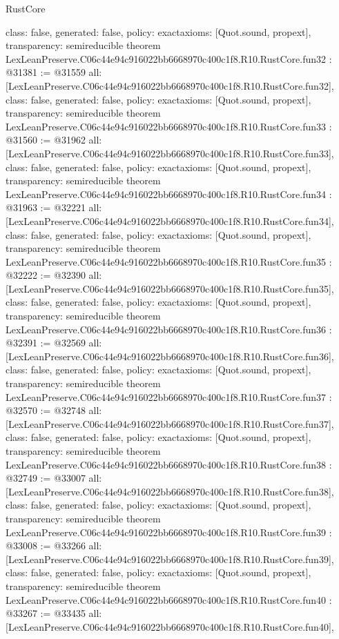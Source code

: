 \begin{lexlean}{RustCore}
\begin{coremodule}
{  class: false,
  generated: false,
  policy: exact{axioms: [Quot.sound, propext]},
  transparency: semireducible
}
theorem LexLeanPreserve.C06c44e94c916022bb6668970c400c1f8.R10.RustCore.fun32 : @31381 := @31559 {
  all: [LexLeanPreserve.C06c44e94c916022bb6668970c400c1f8.R10.RustCore.fun32],
  class: false,
  generated: false,
  policy: exact{axioms: [Quot.sound, propext]},
  transparency: semireducible
}
theorem LexLeanPreserve.C06c44e94c916022bb6668970c400c1f8.R10.RustCore.fun33 : @31560 := @31962 {
  all: [LexLeanPreserve.C06c44e94c916022bb6668970c400c1f8.R10.RustCore.fun33],
  class: false,
  generated: false,
  policy: exact{axioms: [Quot.sound, propext]},
  transparency: semireducible
}
theorem LexLeanPreserve.C06c44e94c916022bb6668970c400c1f8.R10.RustCore.fun34 : @31963 := @32221 {
  all: [LexLeanPreserve.C06c44e94c916022bb6668970c400c1f8.R10.RustCore.fun34],
  class: false,
  generated: false,
  policy: exact{axioms: [Quot.sound, propext]},
  transparency: semireducible
}
theorem LexLeanPreserve.C06c44e94c916022bb6668970c400c1f8.R10.RustCore.fun35 : @32222 := @32390 {
  all: [LexLeanPreserve.C06c44e94c916022bb6668970c400c1f8.R10.RustCore.fun35],
  class: false,
  generated: false,
  policy: exact{axioms: [Quot.sound, propext]},
  transparency: semireducible
}
theorem LexLeanPreserve.C06c44e94c916022bb6668970c400c1f8.R10.RustCore.fun36 : @32391 := @32569 {
  all: [LexLeanPreserve.C06c44e94c916022bb6668970c400c1f8.R10.RustCore.fun36],
  class: false,
  generated: false,
  policy: exact{axioms: [Quot.sound, propext]},
  transparency: semireducible
}
theorem LexLeanPreserve.C06c44e94c916022bb6668970c400c1f8.R10.RustCore.fun37 : @32570 := @32748 {
  all: [LexLeanPreserve.C06c44e94c916022bb6668970c400c1f8.R10.RustCore.fun37],
  class: false,
  generated: false,
  policy: exact{axioms: [Quot.sound, propext]},
  transparency: semireducible
}
theorem LexLeanPreserve.C06c44e94c916022bb6668970c400c1f8.R10.RustCore.fun38 : @32749 := @33007 {
  all: [LexLeanPreserve.C06c44e94c916022bb6668970c400c1f8.R10.RustCore.fun38],
  class: false,
  generated: false,
  policy: exact{axioms: [Quot.sound, propext]},
  transparency: semireducible
}
theorem LexLeanPreserve.C06c44e94c916022bb6668970c400c1f8.R10.RustCore.fun39 : @33008 := @33266 {
  all: [LexLeanPreserve.C06c44e94c916022bb6668970c400c1f8.R10.RustCore.fun39],
  class: false,
  generated: false,
  policy: exact{axioms: [Quot.sound, propext]},
  transparency: semireducible
}
theorem LexLeanPreserve.C06c44e94c916022bb6668970c400c1f8.R10.RustCore.fun40 : @33267 := @33435 {
  all: [LexLeanPreserve.C06c44e94c916022bb6668970c400c1f8.R10.RustCore.fun40],
}
\end{coremodule}
\end{lexlean}
